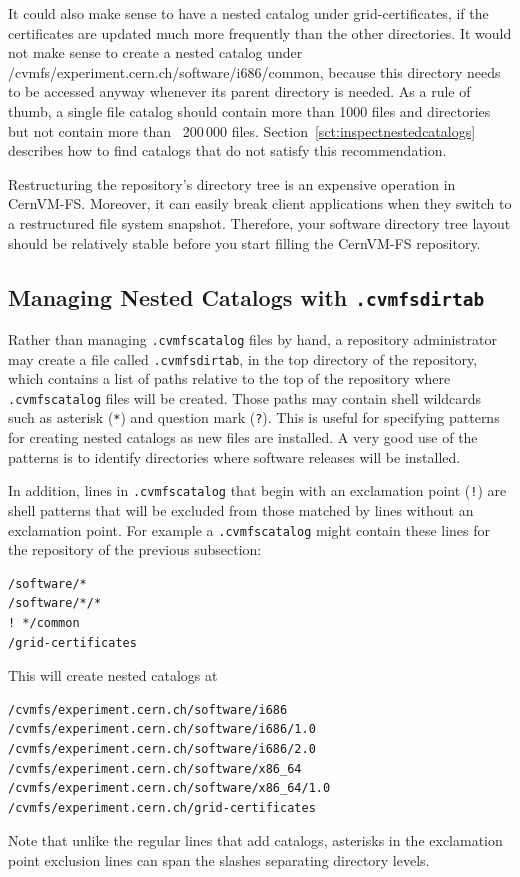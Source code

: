It could also make sense to have a nested catalog under grid-certificates, if the certificates are updated much more frequently than the other directories. 
It would not make sense to create a nested catalog under /cvmfs/experiment.cern.ch/software/i686/common, because this directory needs to be accessed anyway whenever its parent directory is needed.
As a rule of thumb, a single file catalog should contain more than 1000 files and directories but not contain more than ~200\,000 files.
Section~\ref{sct:inspectnestedcatalogs} describes how to find catalogs that do not satisfy this recommendation.

Restructuring the repository's directory tree is an expensive operation in CernVM-FS. 
Moreover, it can easily break client applications when they switch to a restructured file system snapshot. 
Therefore, your software directory tree layout should be relatively stable before you start filling the CernVM-FS repository.

\subsection{Managing Nested Catalogs with \texttt{.cvmfsdirtab}}
Rather than managing \texttt{.cvmfscatalog} files by hand, a repository administrator may create a file called \texttt{.cvmfsdirtab}, in the top directory of the repository, which contains a list of paths relative to the top of the repository where \texttt{.cvmfscatalog} files will be created. 
Those paths may contain shell wildcards such as asterisk (\texttt{*}) and question mark (\texttt{?}).
This is useful for specifying patterns for creating nested catalogs as new files are installed. 
A very good use of the patterns is to identify directories where software releases will be installed.  

In addition, lines in \texttt{.cvmfscatalog} that begin with an exclamation point (\texttt{!}) are shell patterns that will be excluded from those matched by lines without an exclamation point.
For example a \texttt{.cvmfscatalog} might contain these lines for the repository of the previous subsection:
\begin{verbatim}
/software/*
/software/*/*
! */common
/grid-certificates
\end{verbatim}
This will create nested catalogs at
\begin{verbatim}
/cvmfs/experiment.cern.ch/software/i686
/cvmfs/experiment.cern.ch/software/i686/1.0
/cvmfs/experiment.cern.ch/software/i686/2.0
/cvmfs/experiment.cern.ch/software/x86_64
/cvmfs/experiment.cern.ch/software/x86_64/1.0 
/cvmfs/experiment.cern.ch/grid-certificates
\end{verbatim}
Note that unlike the regular lines that add catalogs, asterisks in the exclamation point exclusion lines can span the slashes separating directory levels.

